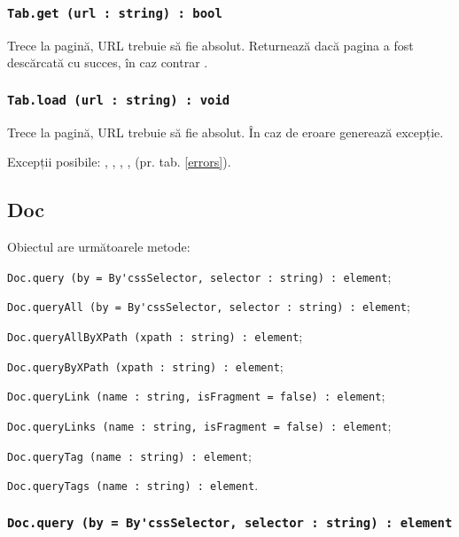 \subsubsection{\lstinline|Tab.get (url : string) : bool|}

Trece la pagină, URL trebuie să fie absolut. Returnează \true{} dacă pagina a fost descărcată cu succes, în caz contrar \false.

\subsubsection{\lstinline|Tab.load (url : string) : void|}

Trece la pagină, URL trebuie să fie absolut. În caz de eroare generează excepție.

Excepții posibile: , , , ,  (pr. tab. \ref{errors}).

\subsection{{\color{orange} Doc}}

Obiectul \dom{} are următoarele metode:
\begin{icItems}
	\item \lstinline|Doc.query (by = By'cssSelector, selector : string) : element|;
	\item \lstinline|Doc.queryAll (by = By'cssSelector, selector : string) : element|;
	\item \lstinline|Doc.queryAllByXPath (xpath : string) : element|;
	\item \lstinline|Doc.queryByXPath (xpath : string) : element|;
	\item \lstinline|Doc.queryLink (name : string, isFragment = false) : element|;
	\item \lstinline|Doc.queryLinks (name : string, isFragment = false) : element|;
	\item \lstinline|Doc.queryTag (name : string) : element|;
	\item \lstinline|Doc.queryTags (name : string) : element|.
\end{icItems}

\subsubsection{\lstinline|Doc.query (by = By'cssSelector, selector : string) : element|}

